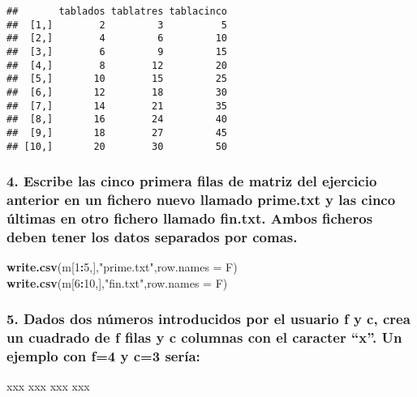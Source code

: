 \documentclass[]{article}
\newenvironment{Shaded}{\begin{snugshade}}{\end{snugshade}}
\newcommand{\KeywordTok}[1]{\textcolor[rgb]{0.13,0.29,0.53}{\textbf{#1}}}
\newcommand{\DataTypeTok}[1]{\textcolor[rgb]{0.13,0.29,0.53}{#1}}
\newcommand{\DecValTok}[1]{\textcolor[rgb]{0.00,0.00,0.81}{#1}}
\newcommand{\StringTok}[1]{\textcolor[rgb]{0.31,0.60,0.02}{#1}}
\newcommand{\OperatorTok}[1]{\textcolor[rgb]{0.81,0.36,0.00}{\textbf{#1}}}
\newcommand{\NormalTok}[1]{#1}
\begin{document}
\begin{verbatim}
##       tablados tablatres tablacinco
##  [1,]        2         3          5
##  [2,]        4         6         10
##  [3,]        6         9         15
##  [4,]        8        12         20
##  [5,]       10        15         25
##  [6,]       12        18         30
##  [7,]       14        21         35
##  [8,]       16        24         40
##  [9,]       18        27         45
## [10,]       20        30         50
\end{verbatim}

\subsubsection{4. Escribe las cinco primera filas de matriz del
ejercicio anterior en un fichero nuevo llamado prime.txt y las cinco
últimas en otro fichero llamado fin.txt. Ambos ficheros deben tener los
datos separados por
comas.}\label{escribe-las-cinco-primera-filas-de-matriz-del-ejercicio-anterior-en-un-fichero-nuevo-llamado-prime.txt-y-las-cinco-ultimas-en-otro-fichero-llamado-fin.txt.-ambos-ficheros-deben-tener-los-datos-separados-por-comas.}

\begin{Shaded}
\begin{Highlighting}[]
\KeywordTok{write.csv}\NormalTok{(m[}\DecValTok{1}\OperatorTok{:}\DecValTok{5}\NormalTok{,],}\StringTok{"prime.txt"}\NormalTok{,}\DataTypeTok{row.names =}\NormalTok{ F)}
\KeywordTok{write.csv}\NormalTok{(m[}\DecValTok{6}\OperatorTok{:}\DecValTok{10}\NormalTok{,],}\StringTok{"fin.txt"}\NormalTok{,}\DataTypeTok{row.names =}\NormalTok{ F)}
\end{Highlighting}
\end{Shaded}

\subsubsection{\texorpdfstring{5. Dados dos números introducidos por el
usuario f y c, crea un cuadrado de f filas y c columnas con el caracter
``x''. Un ejemplo con f=4 y c=3
sería:}{5. Dados dos números introducidos por el usuario f y c, crea un cuadrado de f filas y c columnas con el caracter x. Un ejemplo con f=4 y c=3 sería:}}\label{dados-dos-numeros-introducidos-por-el-usuario-f-y-c-crea-un-cuadrado-de-f-filas-y-c-columnas-con-el-caracter-x.-un-ejemplo-con-f4-y-c3-seria}

xxx \newline
xxx \newline
xxx \newline
xxx \newline
\end{document}
